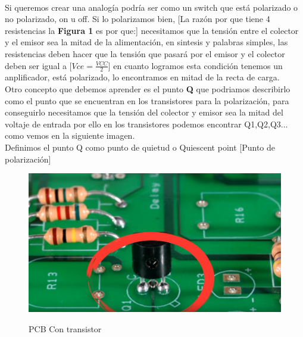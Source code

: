\documentclass[letterpaper]{article}
\begin{document}
\begin{large}
\begin{figure}[hbtp]
\end{figure}\\
Si queremos crear una analogía podría ser como un switch que está polarizado o no polarizado, on u off. Si lo polarizamos bien, [La razón por que tiene 4 resistencias la \textbf{Figura 1} es por que:] necesitamos que la tensión entre el colector y el emisor sea la mitad de la alimentación, en sintesis y palabras simples, las resistencias deben hacer que la tensión que pasará por el emisor y el colector deben ser igual a [$Vce = \frac{VCC}{2}$] en cuanto logramos esta condición tenemos un anplificador, está polarizado, lo encontramos en mitad de la recta de carga.\\
\vspace{1cm}
Otro concepto que debemos aprender es el punto \textbf{Q} que podriamos describirlo como el punto que se encuentran en los transistores para la polarización, para conseguirlo necesitamos que la tensión del colector y emisor sea la mitad del voltaje de entrada por ello en los transistores podemos encontrar Q1,Q2,Q3... como vemos en la siguiente imagen.\\
Definimos el punto Q como punto de quietud o Quiescent point [Punto de polarización]\\
\begin{figure}[hbtp]
\caption{PCB Con transistor}
\centering
\includegraphics[scale=.3]{Imagenes/q1.png}\\
\end{figure}
\newpage


\end{large}
\end{document}

